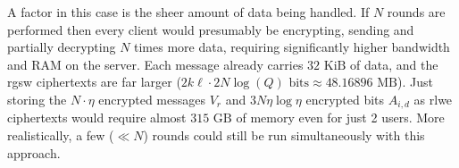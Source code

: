 A factor in this case is the sheer amount of data being handled. If $N$ rounds are performed then every client would presumably be encrypting, sending and partially decrypting $N$ times more data, requiring significantly higher bandwidth and RAM on the server. Each message already carries $32\text{ KiB}$ of data, and the \gls{rgsw} ciphertexts are far larger ($2k\ell \cdot 2N\log(Q) \text{ bits} \approx 48.16896 \text{ MB}$). Just storing the $N\cdot\eta$ encrypted messages $V_r$ and $3N\eta\log{\eta}$ encrypted bits $A_{i,d}$ as \gls{rlwe} ciphertexts would require almost $ \text{315 GB}$ of memory even for just 2 users. More realistically, a few ($\ll N$) rounds could still be run simultaneously with this approach.

\newpage